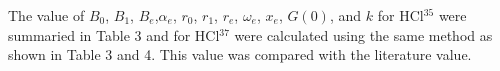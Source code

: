 \documentclass[twocolumn]{article} %
\begin{document}
The value of $B_0$, $B_1$, $B_e$,$\alpha_e$, $r_0$, $r_1$, $r_e$, $\omega_e$, $x_e$, $G(0)$, and $k$ for HCl$^{35}$ were summaried in Table 3 and for HCl$^{37}$ were calculated using the same method as shown in Table 3 and 4. This value was compared with the literature value.
\end{document}
